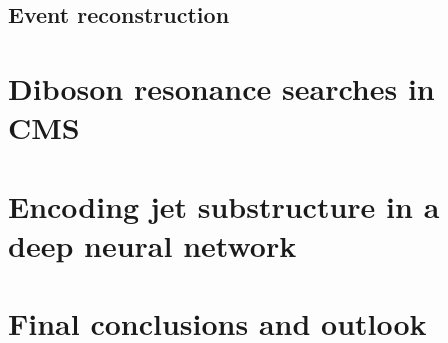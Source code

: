 \documentclass[12pt,USenglish,a4]{book}
\begin{document}
\chapter{Event reconstruction} %
\label{ch:objreco}


\part{Diboson resonance searches in CMS}
\label{ch:diboson}


\part{Encoding jet substructure in a deep neural network}
\label{ch:lola}


\part{Final conclusions and outlook}	
\label{ch:summary}

\clearpage

\newpage\thispagestyle{empty}\mbox{}

\appendix
\label{app}
\vspace*{\fill}\newpage



\newpage





\end{document}
